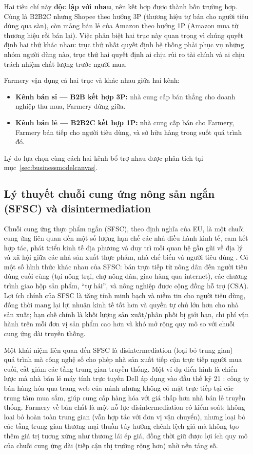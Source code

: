 Hai tiêu chí này \textbf{độc lập với nhau}, nên kết hợp được thành bốn trường hợp. Cùng là B2B2C nhưng Shopee theo hướng 3P (thương hiệu tự bán cho người tiêu dùng qua sàn), còn mảng bán lẻ của Amazon theo hướng 1P (Amazon mua từ thương hiệu rồi bán lại). Việc phân biệt hai trục này quan trọng vì chúng quyết định hai thứ khác nhau: trục thứ nhất quyết định hệ thống phải phục vụ những nhóm người dùng nào, trục thứ hai quyết định ai chịu rủi ro tài chính và ai chịu trách nhiệm chất lượng trước người mua.

Farmery vận dụng cả hai trục và khác nhau giữa hai kênh:
\begin{itemize}
    \item \textbf{Kênh bán sỉ --- B2B kết hợp 3P:} nhà cung cấp bán thẳng cho doanh nghiệp thu mua, Farmery đứng giữa.
    \item \textbf{Kênh bán lẻ --- B2B2C kết hợp 1P:} nhà cung cấp bán cho Farmery, Farmery bán tiếp cho người tiêu dùng, và sở hữu hàng trong suốt quá trình đó.
\end{itemize}
Lý do lựa chọn cùng cách hai kênh bổ trợ nhau được phân tích tại mục~\ref{sec:businessmodelcanvas}.

\subsection{Lý thuyết chuỗi cung ứng nông sản ngắn (SFSC) và disintermediation}

Chuỗi cung ứng thực phẩm ngắn (SFSC), theo định nghĩa của EU, là một chuỗi cung ứng liên quan đến một số lượng hạn chế các nhà điều hành kinh tế, cam kết hợp tác, phát triển kinh tế địa phương và duy trì mối quan hệ gần gũi về địa lý và xã hội giữa các nhà sản xuất thực phẩm, nhà chế biến và người tiêu dùng \parencite{tapchicongsan2018}. Có một số hình thức khác nhau của SFSC: bán trực tiếp từ nông dân đến người tiêu dùng cuối cùng (tại nông trại, chợ nông dân, giao hàng qua internet), các chương trình giao hộp sản phẩm, ``tự hái'', và nông nghiệp được cộng đồng hỗ trợ (CSA). Lợi ích chính của SFSC là tăng tính minh bạch và niềm tin cho người tiêu dùng, đồng thời mang lại lợi nhuận kinh tế tốt hơn và quyền tự chủ lớn hơn cho nhà sản xuất; hạn chế chính là khối lượng sản xuất/phân phối bị giới hạn, chi phí vận hành trên mỗi đơn vị sản phẩm cao hơn và khó mở rộng quy mô so với chuỗi cung ứng dài truyền thống.

Một khái niệm liên quan đến SFSC là disintermediation (loại bỏ trung gian) --- quá trình mà công nghệ số cho phép nhà sản xuất tiếp cận trực tiếp người mua cuối, cắt giảm các tầng trung gian truyền thống. Một ví dụ điển hình là chiến lược mà nhà bán lẻ máy tính trực tuyến Dell áp dụng vào đầu thế kỷ 21 \parencite{britannica_disintermediation}: công ty bán hàng hóa qua trang web của mình nhưng không có mặt trực tiếp tại các trung tâm mua sắm, giúp cung cấp hàng hóa với giá thấp hơn nhà bán lẻ truyền thống. Farmery về bản chất là một nỗ lực disintermediation có kiểm soát: không loại bỏ hoàn toàn trung gian (vẫn hợp tác với đơn vị vận chuyển), nhưng loại bỏ các tầng trung gian thương mại thuần túy hưởng chênh lệch giá mà không tạo thêm giá trị tương xứng như thương lái ép giá, đồng thời giữ được lợi ích quy mô của chuỗi cung ứng dài (tiếp cận thị trường rộng hơn) nhờ nền tảng số.

